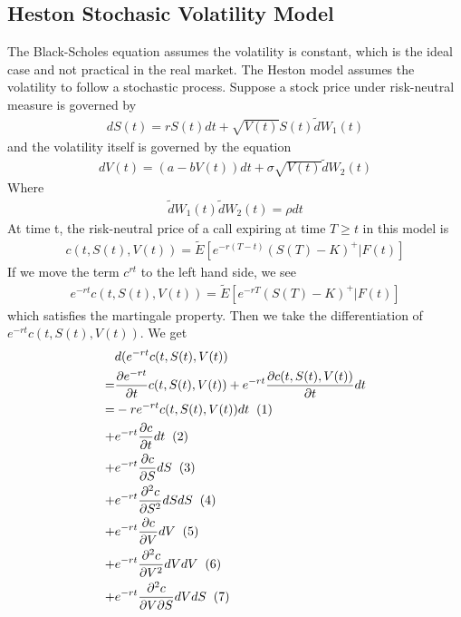 \documentclass[a4paper]{article}
\begin{document}
\subsection{Heston Stochasic Volatility Model}
The Black-Scholes equation assumes the volatility is constant, which is the ideal case and not practical in the real market. The Heston model assumes the volatility to follow a stochastic process. Suppose a stock price under risk-neutral measure is governed by
\begin{align}
	dS(t) = rS(t)dt + \sqrt{V(t)} S(t) \tilde dW_1(t)
\end{align}
and the volatility itself is governed by the equation
\begin{align}
	dV(t) = (a -bV(t))dt + \sigma \sqrt{V(t)} \tilde dW_2(t)
\end{align}
Where 
\begin{align*}
	\tilde dW_1(t) \tilde dW_2(t) = \rho dt
\end{align*}
At time t, the risk-neutral price of a call expiring at time $T \geq t$ in this model is
\begin{align*}
	c(t, S(t), V(t)) = \tilde E[e^{-r(T-t)}(S(T)-K)^+|F(t)]
\end{align*}
If we move the term $c^{rt}$ to the left hand side, we see
\begin{align}
	e^{-rt}c(t, S(t), V(t)) = \tilde E[e^{-rT}(S(T)-K)^+|F(t)]
\end{align}
which satisfies the martingale property.
Then we take the differentiation of $e^{-rt}c(t, S(t), V(t))$. We get
\begin{align*}
	& d(e^{-rt}c(t, S(t), V(t))\\
	= & \frac{\partial e^{-rt}}{\partial t} c(t, S(t), V(t)) 
	+ e^{-rt}\frac{\partial c(t, S(t), V(t))}{\partial t} dt \\
	= & -re^{-rt}c(t, S(t),V(t))dt \hspace{2mm} (1)\\
	+ & e^{-rt} \frac{\partial c}{\partial t} dt \hspace{2mm} (2) \\
	+ & e^{-rt} \frac{\partial c}{\partial S} dS \hspace{2mm} (3) \\
	+ & e^{-rt} \frac{\partial^2 c}{\partial S^2} dS dS \hspace{2mm} (4)\\
	+ & e^{-rt} \frac{\partial c}{\partial V} dV \hspace{2mm} (5) \\
	+ & e^{-rt} \frac{\partial^2 c}{\partial V^2} dV dV\hspace{2mm} (6)\\
	+ & e^{-rt} \frac{\partial^2 c}{\partial V \partial S} dV dS\hspace{2mm} (7)
\end{align*}
\end{document}
